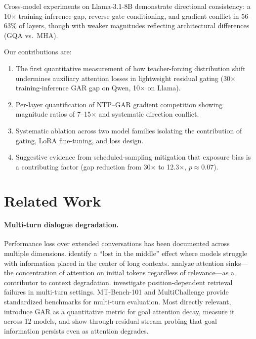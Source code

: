 \documentclass[11pt]{article}
\begin{document}
Cross-model experiments on Llama-3.1-8B demonstrate directional consistency: a 10$\times$ training-inference gap, reverse gate conditioning, and gradient conflict in 56--63\% of layers, though with weaker magnitudes reflecting architectural differences (GQA vs.\ MHA).

Our contributions are:
\begin{enumerate}
\item The first quantitative measurement of how teacher-forcing distribution shift undermines auxiliary attention losses in lightweight residual gating (30$\times$ training-inference GAR gap on Qwen, 10$\times$ on Llama).
\item Per-layer quantification of NTP--GAR gradient competition showing magnitude ratios of 7--15$\times$ and systematic direction conflict.
\item Systematic ablation across two model families isolating the contribution of gating, LoRA fine-tuning, and loss design.
\item Suggestive evidence from scheduled-sampling mitigation that exposure bias is a contributing factor (gap reduction from 30$\times$ to 12.3$\times$, $p{\approx}0.07$).
\end{enumerate}

\section{Related Work}

\paragraph{Multi-turn dialogue degradation.}
Performance loss over extended conversations has been documented across multiple dimensions.
\citet{liu2024lost} identify a ``lost in the middle'' effect where models struggle with information placed in the center of long contexts.
\citet{xiao2024efficient} analyze attention sinks---the concentration of attention on initial tokens regardless of relevance---as a contributor to context degradation.
\citet{ko2024found} investigate position-dependent retrieval failures in multi-turn settings.
MT-Bench-101 \cite{bai2024mt} and MultiChallenge \cite{wang2024multichallenge} provide standardized benchmarks for multi-turn evaluation.
Most directly relevant, \citet{dongre2026multi} introduce GAR as a quantitative metric for goal attention decay, measure it across 12 models, and show through residual stream probing that goal information persists even as attention degrades.
\end{document}
